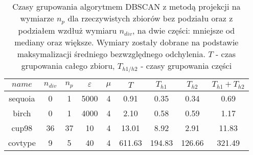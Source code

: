 \begin{table}
	\centering
	\begin{tabular}{ c | c | c | c |  c | c | c | c | c | }
		$ name $ & $ n_{div} $ & $ n_p $ & $ \varepsilon $ & $ \mu $ & $ T $ & $ T_{h1} $ & $ T_{h2} $ & $ T_{h1}+T_{h2} $\\ \hline
		 sequoia  & 0 & 1 & 5000 & 4 & 0.91 & 0.35 & 0.34 & 0.69 \\ \hline
		 birch  & 0 & 1 & 4000 & 4 & 2.10 & 0.58 & 0.59 & 1.17 \\ \hline
		 cup98  & 36 & 37 & 10 & 4 & 13.01 & 8.92 & 2.91 & 11.83 \\ \hline
		covtype & 9 & 5 & 40 & 4 & 611.63 & 194.83 & 126.66 & 321.49 \\ \hline
	\end{tabular}
	\caption{Czasy grupowania algorytmem DBSCAN z metodą projekcji na wymiarze $ n_p $ dla rzeczywistych zbiorów bez podziału oraz z podziałem wzdłuż wymiaru $ n_{div} $, na dwie części: mniejsze od mediany oraz większe. Wymiary zostały dobrane na podstawie maksymalizacji średniego bezwzględnego odchylenia. $ T $ - czas grupowania całego zbioru, $ T_{h1/h2} $ - czasy grupowania części}\label{qscan:projection-space-cut-times}
\end{table}